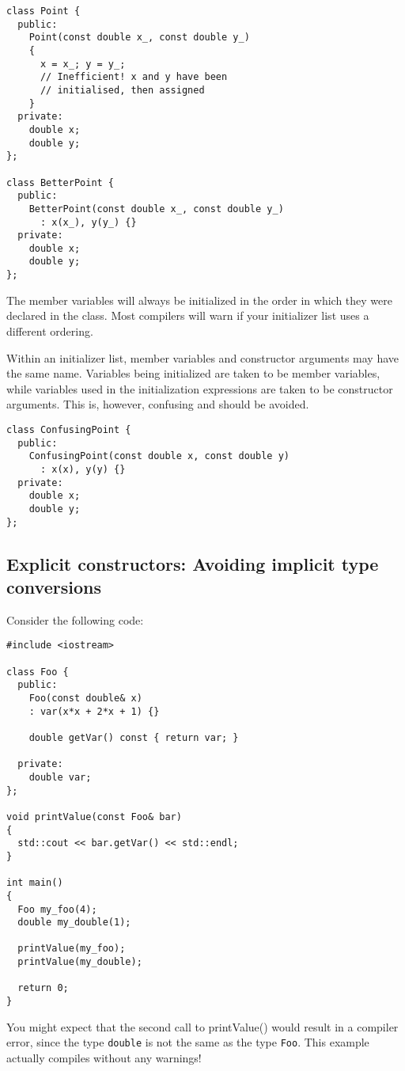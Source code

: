 \documentclass[a4paper]{scrartcl}
\begin{document}
\begin{verbatim}
class Point {
  public:
    Point(const double x_, const double y_)
    {
      x = x_; y = y_;
      // Inefficient! x and y have been
      // initialised, then assigned
    }
  private:
    double x;
    double y;
};

class BetterPoint {
  public:
    BetterPoint(const double x_, const double y_)
      : x(x_), y(y_) {}
  private:
    double x;
    double y;
};
\end{verbatim}

The member variables will always be initialized in the order in which they were declared in the class. Most compilers will warn if your initializer list uses a different ordering.

Within an initializer list, member variables and constructor arguments may have the same name. Variables being initialized are taken to be member variables, while variables used in the initialization expressions are taken to be constructor arguments. This is, however, confusing and should be avoided.

\begin{verbatim}
class ConfusingPoint {
  public:
    ConfusingPoint(const double x, const double y)
      : x(x), y(y) {}
  private:
    double x;
    double y;
};
\end{verbatim}

\subsection{Explicit constructors: Avoiding implicit type conversions}
Consider the following code:
\begin{verbatim}
#include <iostream>

class Foo {
  public:
    Foo(const double& x)
    : var(x*x + 2*x + 1) {}
	
    double getVar() const { return var; }

  private:
    double var;
};

void printValue(const Foo& bar)
{
  std::cout << bar.getVar() << std::endl;
}

int main()
{
  Foo my_foo(4);
  double my_double(1);

  printValue(my_foo);
  printValue(my_double);

  return 0;
}
\end{verbatim}

You might expect that the second call to printValue() would result in a compiler error, since the type \texttt{double} is not the same as the type \texttt{Foo}. This example actually compiles without any warnings!
\end{document}
